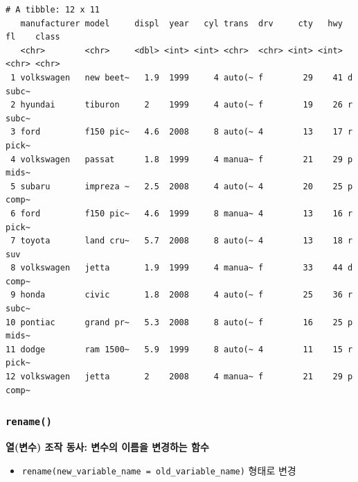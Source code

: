 \documentclass[
  11pt,
]{krantz}
\makeatletter
\newenvironment{Shaded}{\begin{snugshade}}{\end{snugshade}}
\newcommand{\CommentTok}[1]{\textcolor[rgb]{0.37,0.37,0.37}{\textit{#1}}}
\newcommand{\FloatTok}[1]{\textcolor[rgb]{0.06,0.06,0.06}{#1}}
\newcommand{\KeywordTok}[1]{\textcolor[rgb]{0.27,0.27,0.27}{\textbf{#1}}}
\newcommand{\NormalTok}[1]{#1}
\newcommand{\OperatorTok}[1]{\textcolor[rgb]{0.43,0.43,0.43}{\textbf{#1}}}
\newcommand{\StringTok}[1]{\textcolor[rgb]{0.5,0.5,0.5}{#1}}
\providecommand{\tightlist}{%
  \setlength{\itemsep}{0pt}\setlength{\parskip}{0pt}}
\newenvironment{kframe}{%
\medskip{}
\setlength{\fboxsep}{.8em}
 \def\at@end@of@kframe{}%
 \ifinner\ifhmode%
  \def\at@end@of@kframe{\end{minipage}}%
  \begin{minipage}{\columnwidth}%
 \fi\fi%
 \def\FrameCommand##1{\hskip\@totalleftmargin \hskip-\fboxsep
 \colorbox{shadecolor}{##1}\hskip-\fboxsep
     \hskip-\linewidth \hskip-\@totalleftmargin \hskip\columnwidth}%
 \MakeFramed {\advance\hsize-\width
   \@totalleftmargin\z@ \linewidth\hsize
   \@setminipage}}%
 {\par\unskip\endMakeFramed%
 \at@end@of@kframe}
\renewenvironment{quote}{\begin{kframe}}{\end{kframe}}
\makeatother
\begin{document}
\begin{Shaded}
\end{Shaded}

\begin{verbatim}
# A tibble: 12 x 11
   manufacturer model     displ  year   cyl trans  drv     cty   hwy fl    class
   <chr>        <chr>     <dbl> <int> <int> <chr>  <chr> <int> <int> <chr> <chr>
 1 volkswagen   new beet~   1.9  1999     4 auto(~ f        29    41 d     subc~
 2 hyundai      tiburon     2    1999     4 auto(~ f        19    26 r     subc~
 3 ford         f150 pic~   4.6  2008     8 auto(~ 4        13    17 r     pick~
 4 volkswagen   passat      1.8  1999     4 manua~ f        21    29 p     mids~
 5 subaru       impreza ~   2.5  2008     4 auto(~ 4        20    25 p     comp~
 6 ford         f150 pic~   4.6  1999     8 manua~ 4        13    16 r     pick~
 7 toyota       land cru~   5.7  2008     8 auto(~ 4        13    18 r     suv  
 8 volkswagen   jetta       1.9  1999     4 manua~ f        33    44 d     comp~
 9 honda        civic       1.8  2008     4 auto(~ f        25    36 r     subc~
10 pontiac      grand pr~   5.3  2008     8 auto(~ f        16    25 p     mids~
11 dodge        ram 1500~   5.9  1999     8 auto(~ 4        11    15 r     pick~
12 volkswagen   jetta       2    2008     4 manua~ f        21    29 p     comp~
\end{verbatim}

\normalsize

\hypertarget{dplyr-rename}{%
\subsubsection*{\texorpdfstring{\texttt{rename()}}{rename()}}\label{dplyr-rename}}


\begin{quote}
\textbf{열(변수) 조작 동사: 변수의 이름을 변경하는 함수}
\end{quote}

\begin{itemize}
\tightlist
\item
  \texttt{rename(new\_variable\_name\ =\ old\_variable\_name)} 형태로 변경
\end{itemize}
\end{document}
